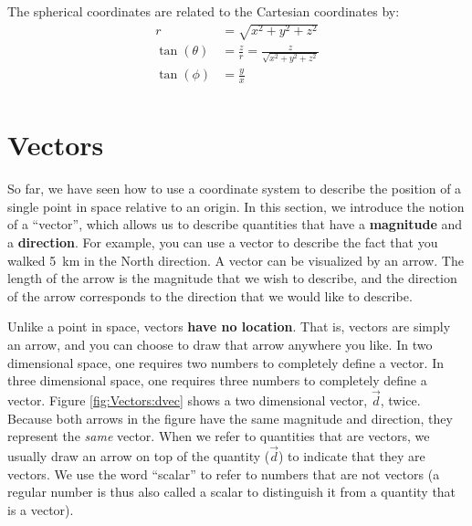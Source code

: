 The spherical coordinates are related to the Cartesian coordinates by:
\begin{align*}
r &= \sqrt{x^2+y^2+z^2}\\
\tan(\theta) &= \frac{z}{r}=\frac{z}{\sqrt{x^2+y^2+z^2}}\\
\tan(\phi) &= \frac{y}{x}\\
\end{align*}

\section{Vectors}
So far, we have seen how to use a coordinate system to describe the position of a single point in space relative to an origin. In this section, we introduce the notion of a ``vector'', which allows us to describe quantities that have a \textbf{magnitude} and a \textbf{direction}. For example, you can use a vector to describe the fact that you walked \SI{5}{km} in the North direction. A vector can be visualized by an arrow. The length of the arrow is the magnitude that we wish to describe, and the direction of the arrow corresponds to the direction that we would like to describe. 

Unlike a point in space, vectors \textbf{have no location}. That is, vectors are simply an arrow, and you can choose to draw that arrow anywhere you like. In two dimensional space, one requires two numbers to completely define a vector. In three dimensional space, one requires three numbers to completely define a vector. Figure \ref{fig:Vectors:dvec} shows a two dimensional vector, $\vec d$, twice. Because both arrows in the figure have the same magnitude and direction, they represent the \textit{same} vector. When we refer to quantities that are vectors, we usually draw an arrow on top of the quantity ($\vec d$) to indicate that they are vectors. We use the word ``scalar'' to refer to numbers that are not vectors (a regular number is thus also called a scalar to distinguish it from a quantity that is a vector).


